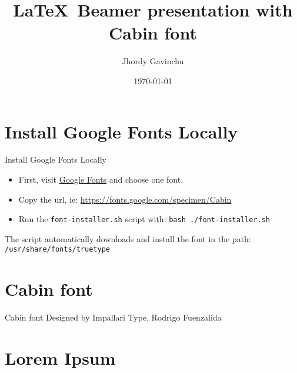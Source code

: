 \documentclass{beamer}
\title{\LaTeX\, Beamer presentation with Cabin font}
\author{Jhordy Gavinchu}
\institute{\href{https://jhordyess.com}{Jhordyess}}
\date{\today}
\begin{document}
\maketitle

\section{Install Google Fonts Locally}

\begin{frame}{Install Google Fonts Locally}
  \begin{itemize}
    \item First, visit \href{https://fonts.google.com/}{Google Fonts} and choose one font.
    \item Copy the url, ie: \href{https://fonts.google.com/specimen/Cabin}{https://fonts.google.com/specimen/Cabin}
    \item Run the \lstinline{font-installer.sh} script with: \lstinline{bash ./font-installer.sh}
  \end{itemize}
  The script automatically downloads and install the font in the path: \lstinline{/usr/share/fonts/truetype}
\end{frame}

\section{Cabin font}

\begin{frame}{Cabin font}
  Designed by Impallari Type, Rodrigo Fuenzalida
  \href{https://fonts.google.com/specimen/Cabin/tester}{}
\end{frame}

\section{Lorem Ipsum}
\end{document}
